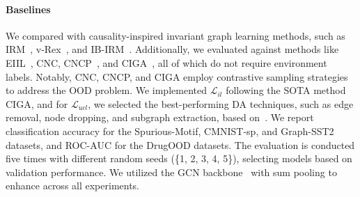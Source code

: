 \paragraph{Baselines} We compared \ours with causality-inspired invariant graph learning methods, such as IRM~\cite{irmv1}, v-Rex~\cite{v-rex}, and IB-IRM~\cite{ib-irm}. Additionally, we evaluated \ours against methods like EIIL~\cite{eiil}, CNC, CNCP~\cite{cnc}, and CIGA~\cite{ciga}, all of which do not require environment labels. Notably, CNC, CNCP, and CIGA employ contrastive sampling strategies to address the OOD problem. We implemented $\mathcal{L}_{il}$ following the SOTA method CIGA, and for $\mathcal{L}_{ucl}$, we selected the best-performing DA techniques, such as edge removal, node dropping, and subgraph extraction, based on~\cite{graphCL}.
We report classification accuracy for the Spurious-Motif, CMNIST-sp, and Graph-SST2 datasets, and ROC-AUC for the DrugOOD datasets. 
The evaluation is conducted five times with different random seeds (\{1, 2, 3, 4, 5\}), selecting models based on validation performance. 
We utilized the GCN backbone~\cite{gcn} with sum pooling to enhance across all experiments.



